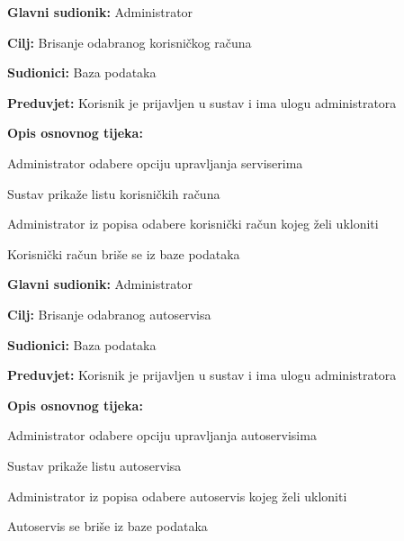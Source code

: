 \noindent {}
\begin{packed_item}
	
	\item \textbf{Glavni sudionik: } Administrator
	\item  \textbf{Cilj:} Brisanje odabranog korisničkog računa
	\item  \textbf{Sudionici:} Baza podataka
	\item  \textbf{Preduvjet:} Korisnik je prijavljen u sustav i ima ulogu administratora
	
	\item  \textbf{Opis osnovnog tijeka:}
	
	\item[] \begin{packed_enum}
		
		\item Administrator odabere opciju upravljanja
		serviserima
		\item Sustav prikaže listu korisničkih računa
		\item Administrator iz popisa odabere korisnički račun kojeg želi ukloniti
		\item Korisnički račun briše se iz baze podataka
		
	\end{packed_enum}
\end{packed_item}

\noindent {}
\begin{packed_item}
	
	\item \textbf{Glavni sudionik: } Administrator
	\item  \textbf{Cilj:} Brisanje odabranog autoservisa
	\item  \textbf{Sudionici:} Baza podataka
	\item  \textbf{Preduvjet:} Korisnik je prijavljen u sustav i ima ulogu administratora
	\item  \textbf{Opis osnovnog tijeka:}
	
	\item[] \begin{packed_enum}
		
		\item Administrator odabere opciju upravljanja autoservisima
		\item Sustav prikaže listu autoservisa
		\item Administrator iz popisa odabere autoservis kojeg želi ukloniti
		\item Autoservis se briše iz baze podataka
	\end{packed_enum}
\end{packed_item}

